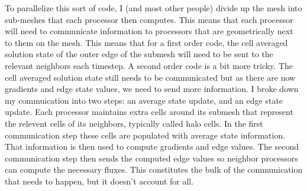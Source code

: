 \documentclass[12pt,parskip=full]{article}
\numberwithin{subsection}{section}
\begin{document}
		To parallelize this sort of code, I (and most other people) divide up the mesh into sub-meshes that each processor then computes.
		This means that each processor will need to communicate information to processors that are geometrically next to them on the 
		mesh. This means that for a first order code, the cell averaged solution state of the outer edge of the submesh will need to be
		sent to the relevant neighbors each timestep. A second order code is a bit more tricky. The cell averaged solution state still
		needs to be communicated but as there are now gradients and edge state values, we need to send more information. I broke down my
		commuication into two steps: an average state update, and an edge state update. Each processor maintains extra cells around its
		submesh that represent the relevent cells of its neighbors, typically called halo cells. In the first communication step these
		cells are populated with average state information. That information is then used to compute gradients and edge values. The
		second communication step then sends the computed edge values so neighbor processors can compute the necessary fluxes.
		This constitutes the bulk of the communication that needs to happen, but it doesn't account for all. 
\end{document}
